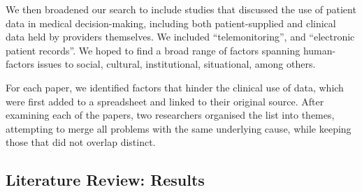 \documentclass{sigchi}
\begin{document}
We then broadened our search to include studies that discussed the use of patient data in medical decision-making, including both patient-supplied and clinical data held by providers themselves.  We included ``telemonitoring'', and ``electronic patient records''.  We  hoped to find a broad range of factors spanning human-factors issues to social, cultural, institutional, situational, among others.

For each paper, we identified factors that hinder the clinical use of data, which were first added to a spreadsheet and linked to their original source.  After examining each of the papers, two researchers organised the list into themes, attempting to merge all problems with the same underlying cause, while keeping those that did not overlap distinct.  %

\subsection{Literature Review: Results}
\end{document}
